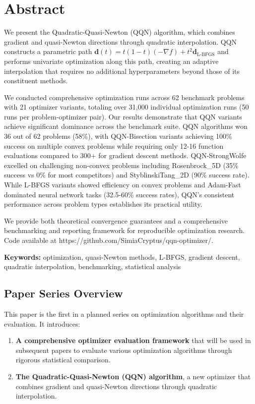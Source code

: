 \hypertarget{abstract}{%
\section{Abstract}\label{abstract}}

We present the Quadratic-Quasi-Newton (QQN) algorithm, which combines gradient and quasi-Newton directions through quadratic interpolation.
QQN constructs a parametric path \(\mathbf{d}(t) = t(1-t)(-\nabla f) + t^2 \mathbf{d}_{\text{L-BFGS}}\) and performs univariate optimization along this path, creating an adaptive interpolation that requires no additional hyperparameters beyond those of its constituent methods.

We conducted comprehensive optimization runs across 62 benchmark problems with 21 optimizer variants, totaling over 31,000 individual optimization runs (50 runs per problem-optimizer pair).
Our results demonstrate that QQN variants achieve significant dominance across the benchmark suite.
QQN algorithms won 36 out of 62 problems (58\%), with QQN-Bisection variants achieving 100\% success on multiple convex problems while requiring only 12-16 function evaluations compared to 300+ for gradient descent methods.
QQN-StrongWolfe excelled on challenging non-convex problems including Rosenbrock\_5D (35\% success vs 0\% for most competitors) and StyblinskiTang\_2D (90\% success rate).
While L-BFGS variants showed efficiency on convex problems and Adam-Fast dominated neural network tasks (32.5-60\% success rates), QQN's consistent performance across problem types establishes its practical utility.

We provide both theoretical convergence guarantees and a comprehensive benchmarking and reporting framework for reproducible optimization research.
Code available at https://github.com/SimiaCryptus/qqn-optimizer/.

\textbf{Keywords:} optimization, quasi-Newton methods, L-BFGS, gradient descent, quadratic interpolation, benchmarking, statistical analysis

\hypertarget{paper-series-overview}{%
\subsection{Paper Series Overview}\label{paper-series-overview}}

This paper is the first in a planned series on optimization algorithms and their evaluation. It introduces:

\begin{enumerate}
\def\labelenumi{\arabic{enumi}.}
\tightlist
\item
  \textbf{A comprehensive optimizer evaluation framework} that will be used in subsequent papers to evaluate various optimization algorithms through rigorous statistical comparison.
\item
  \textbf{The Quadratic-Quasi-Newton (QQN) algorithm}, a new optimizer that combines gradient and quasi-Newton directions through quadratic interpolation.
\end{enumerate}

